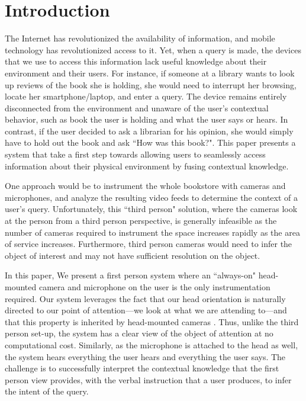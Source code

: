 \documentclass{llncs}
\begin{document}
\section{Introduction}
The Internet has revolutionized the availability of information, and mobile technology has revolutionized access to it. Yet, when a query is made, the devices that we use to access this information lack useful knowledge about their environment and their users. For instance, if someone at a library wants to look up reviews of the book she is holding, she would need to interrupt her browsing, locate her smartphone/laptop, and enter a query. The device remains entirely disconnected from the environment and unaware of the user's contextual behavior, such as book the user is holding and what the user says or hears. In contrast, if the user decided to ask a librarian for his opinion, she would simply have to hold out the book and ask ``How was this book?". This paper presents a system that take a first step towards allowing users to seamlessly access information about their physical environment by fusing contextual knowledge.

One approach would be to instrument the whole bookstore with cameras and microphones, and analyze the resulting video feeds to determine the context of a user's query. Unfortunately, this ``third person" solution, where the cameras look at the person from a third person perspective, is generally infeasible as the number of cameras required to instrument the space increases rapidly as the area of service increases. Furthermore, third person cameras would need to infer the object of interest and may not have sufficient resolution on the object. 

In this paper, We present a first person system \citep{fpv} where an ``always-on" head-mounted camera and microphone on the user is the only instrumentation required. Our system leverages the fact that our head orientation is naturally directed to our point of attention---we look at what we are attending to---and that this property is inherited by head-mounted cameras \citep{Park12}. Thus, unlike the third person set-up, the system has a clear view of the object of attention at no computational cost.  Similarly, as the microphone is attached to the head as well, the system hears everything the user hears and everything the user says. The challenge is to successfully interpret the contextual knowledge that the first person view provides, with the verbal instruction that a user produces, to infer the intent of the query.
\end{document}
